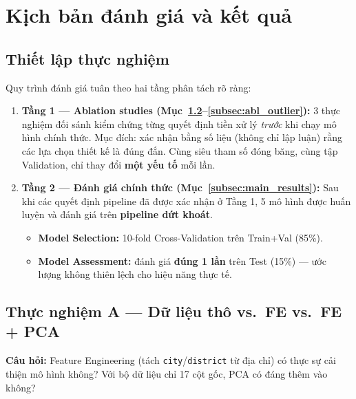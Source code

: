 \section{Kịch bản đánh giá và kết quả}
\label{sec:eval}

\subsection{Thiết lập thực nghiệm}

Quy trình đánh giá tuân theo hai tầng phân tách rõ ràng:

\begin{enumerate}[leftmargin=*, itemsep=3pt]
  \item \textbf{Tầng 1 — Ablation studies (Mục~\ref{subsec:abl_fe}--\ref{subsec:abl_outlier}):}
        3 thực nghiệm đối sánh kiểm chứng từng quyết định tiền xử lý \textit{trước} khi chạy
        mô hình chính thức.
        Mục đích: xác nhận bằng số liệu (không chỉ lập luận) rằng các lựa chọn thiết kế
        là đúng đắn.
        Cùng siêu tham số đóng băng, cùng tập Validation, chỉ thay đổi \textbf{một yếu tố} mỗi lần.

  \item \textbf{Tầng 2 — Đánh giá chính thức (Mục~\ref{subsec:main_results}):}
        Sau khi các quyết định pipeline đã được xác nhận ở Tầng 1,
        5 mô hình được huấn luyện và đánh giá trên \textbf{pipeline dứt khoát}.
        \begin{itemize}[itemsep=1pt]
          \item \textbf{Model Selection:} 10-fold Cross-Validation trên Train+Val (85\%).
          \item \textbf{Model Assessment:} đánh giá \textbf{đúng 1 lần} trên Test (15\%)
                — ước lượng không thiên lệch cho hiệu năng thực tế.
        \end{itemize}
\end{enumerate}

\subsection{Thực nghiệm A — Dữ liệu thô vs.\ FE vs.\ FE + PCA}
\label{subsec:abl_fe}

\textbf{Câu hỏi:} Feature Engineering (tách \texttt{city}/\texttt{district} từ địa chỉ)
có thực sự cải thiện mô hình không?
Với bộ dữ liệu chỉ 17 cột gốc, PCA có đáng thêm vào không?

